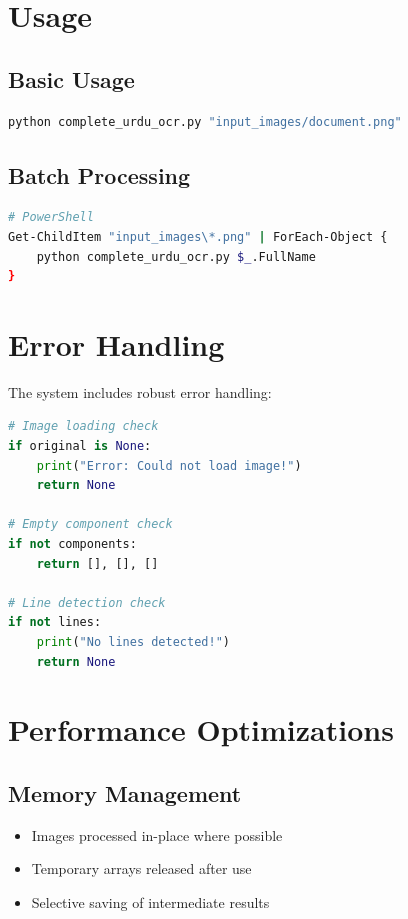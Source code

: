 \documentclass[12pt,a4paper,oneside]{report}
\begin{document}
\section{Usage}

\subsection{Basic Usage}
\begin{lstlisting}[language=bash]
python complete_urdu_ocr.py "input_images/document.png"
\end{lstlisting}

\subsection{Batch Processing}
\begin{lstlisting}[language=bash]
# PowerShell
Get-ChildItem "input_images\*.png" | ForEach-Object {
    python complete_urdu_ocr.py $_.FullName
}
\end{lstlisting}

\section{Error Handling}

The system includes robust error handling:

\begin{lstlisting}[language=Python]
# Image loading check
if original is None:
    print("Error: Could not load image!")
    return None

# Empty component check
if not components:
    return [], [], []

# Line detection check
if not lines:
    print("No lines detected!")
    return None
\end{lstlisting}

\section{Performance Optimizations}

\subsection{Memory Management}
\begin{itemize}
    \item Images processed in-place where possible
    \item Temporary arrays released after use
    \item Selective saving of intermediate results
\end{itemize}
\end{document}
